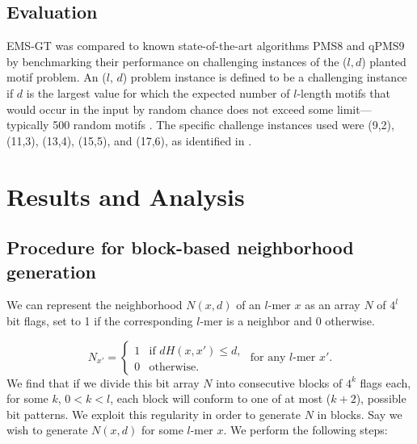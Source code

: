 \documentclass[oneside,12pt]{DISCSthesis}
\begin{document}
	\section{Evaluation}
		EMS-GT was compared to known state-of-the-art algorithms PMS8 and qPMS9 by benchmarking their performance on challenging instances of the ($l, d$) planted motif problem. An ($l$, $d$) problem instance is defined to be a challenging instance if $d$ is the largest value for which the expected number of $l$-length motifs that would occur in the input by random chance does not exceed some limit---typically 500 random motifs \cite{pms2015}. The specific challenge instances used were (9,2), (11,3), (13,4), (15,5), and (17,6), as identified in \cite{pms2015,pms2007}. 
		\bigskip

\chapter{Results and Analysis}
	\section{Procedure for block-based neighborhood generation}
		We can represent the neighborhood $N(x,d)$ of an $l$-mer $x$ as an array $N$ of $4^{l}$ bit flags, set to 1 if the corresponding $l$-mer is a neighbor and 0 otherwise.
		
		\begin{equation*}
			N_{x'} = \left\{
			\begin{array}{rl}
				1 & \text{if } dH(x,x') \leq d,\\
				0 & \text{otherwise.}%
			\end{array} \right.
			\text{ for any $l$-mer }x'.
			\end{equation*}\newline		
		We find that if we divide this bit array $N$ into consecutive blocks of $4^{k}$ flags each, for some $k$, $0 < k < l$, each block will conform to one of at most ($k + 2$), possible bit patterns. We exploit this regularity in order to generate $N$ in blocks.
		Say we wish to generate $N(x,d)$ for some $l$-mer $x$. We perform the following steps:
\end{document}
